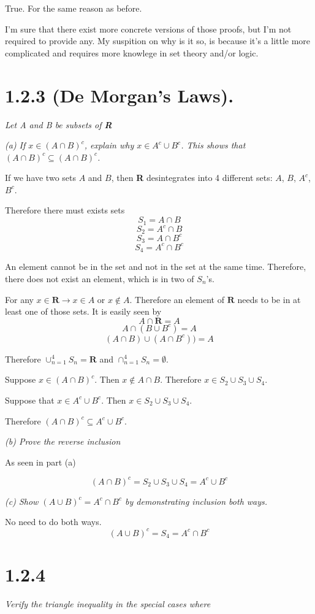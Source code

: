 \documentclass[11pt,oneside,titlepage]{article}
\begin{document}
True. For the same reason as before.

I'm sure that there exist more concrete versions of those proofs, but I'm not
required to provide any. My suspition on why is it so, is because it's a
little more complicated and requires more knowlege in set theory and/or logic.

\section*{1.2.3 (De Morgan's Laws).}

\textit{Let A and B be subsets of \textbf{R}}

\textit{(a) If $x \in (A \cap B)^c$, explain why $x \in A^c \cup B^c$. This
  shows that $(A \cap B)^c \subseteq (A \cap B)^c$.}

If we have two sets $A$ and $B$, then \textbf{R} desintegrates into 4 different
sets: $A$, $B$, $A^c$, $B^c$.

Therefore there must exists sets
$$S_1 = A \cap B$$
$$S_2 = A^c \cap B$$
$$S_3 = A \cap B^c$$
$$S_4 = A^c \cap B^c$$

An element cannot be in the set and not in the set at the same time. Therefore,
there does not exist an element, which is in two of $S_n$'s.

For any $x \in \textbf{R} \to x \in A$ or $x \notin A$. Therefore an element
of $\textbf{R}$ needs to be in at least one of those sets. It is easily seen by
$$A \cap \textbf{R} = A$$
$$A \cap (B \cup B^c) = A$$
$$(A \cap B) \cup (A \cap B^c)) = A$$

Therefore $\cup_{n = 1}^4 S_n = \textbf{R}$ and
$\cap_{n = 1}^4 S_n = \emptyset$.

Suppose $x \in (A \cap B)^c$. Then $x \notin A \cap B$. Therefore
$x \in S_2 \cup S_3 \cup S_4$.

Suppose that $x \in A^c \cup B^c$. Then $x \in S_2 \cup S_3 \cup S_4$.

Therefore $ (A \cap B)^c \subseteq A^c \cup B^c$.

\textit{(b) Prove the reverse inclusion}


As seen in part (a)

$$(A \cap B)^c = S_2 \cup S_3 \cup S_4 = A^c \cup B^c$$

\textit{(c) Show $(A \cup B)^c = A^c \cap B^c$ by demonstrating inclusion both
  ways.}

No need to do both ways.
$$(A \cup B)^c = S_4 = A^c \cap B^c$$


\section*{1.2.4}
\textit{Verify the triangle inequality in the special cases where }
\end{document}
